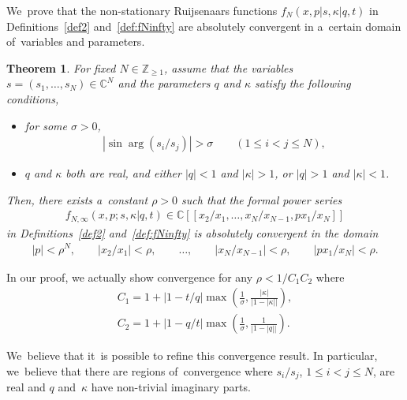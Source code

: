 \documentclass[11pt]{article}
\numberwithin{equation}{section}
\newtheorem{Theorem}{Theorem}[section]
\newcommand{\C}{{\mathbb C}}
\newcommand{\Z}{{\mathbb Z}}
\begin{document}
We~prove that the non-stationary Ruijsenaars functions $f_N\!(x,p|s,\kappa|q,t)$ in Definitions~\ref{def2} and~\ref{def:fNinfty} are absolutely convergent in a~certain domain of~variables and parameters.

\begin{Theorem}\label{thm:converegence}
For fixed $N\in\Z_{\geq 1}$, assume that the variables $s=(s_1,\dots,s_N)\in\C^N$ and the parameters $q$ and $\kappa$ satisfy the following conditions,
\begin{itemize}\itemsep=0pt
\item[$(i)$] for some $\sigma>0$,
\begin{gather*}
{}|\sin\arg(s_i/s_j)|>\sigma \qquad (1\leq i<j\leq N),
\end{gather*}
\item[$(ii)$] $q$ and $\kappa$ both are real, and either $|q|<1$ and $|\kappa|>1$, or $|q|>1$ and $|\kappa|<1$.
\end{itemize}
Then, there exists a~constant $\rho>0$ such that the formal power series
\begin{gather*}
f_{N,\infty}(x,p;s,\kappa|q,t)\in \C[[x_2/x_1,\dots,x_N/x_{N-1},px_1/x_N]]
\end{gather*}
in Definitions~{\rm \ref{def2}} and~{\rm \ref{def:fNinfty}} is absolutely convergent in the domain
\begin{gather}\label{xcond}
|p|<\rho^N,\qquad |x_2/x_1|<\rho,\qquad \dots,\qquad |x_N/x_{N-1}|<\rho,\qquad |px_1/x_N|<\rho.
\end{gather}
\end{Theorem}
\begin{Remark}In our proof, we actually show convergence for any $\rho<1/C_1C_2$ where
\begin{gather}
C_1= 1+|1-t/q|\max\left(\frac1{\sigma}, \frac{|\kappa|}{|1-|\kappa||}\right)\!,\nonumber\\
C_2= 1+|1-q/t|\max\left(\frac1{\sigma},\frac{1}{|1-|q||}\right)\!.\label{C1C2}
\end{gather}
\end{Remark}
\begin{Remark}
We~believe that it~is possible to refine this convergence result. In particular, we~believe that there are regions of~convergence where $s_i/s_j$, $1\leq i<j\leq N$, are real and $q$ and~$\kappa$ have non-trivial imaginary parts.
\end{Remark}
\end{document}
